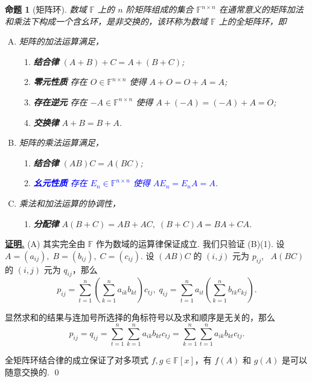 \documentclass[10pt,openany]{article}
\theoremstyle{thmstyle} %
\theoremstyle{defstyle} %
\theoremstyle{prostyle} %
\newtheorem{proposition}[theorem]{命题}
\theoremstyle{exastyle}
\theoremstyle{remstyle}
\renewenvironment{proof}[1][证明]{\par\underline{\textbf{#1.}} \;\fangsong}{\qed\par}
\newcommand{\F}{\mathbb{F}}
\begin{document}
\begin{proposition}[矩阵环]
	数域 \( \F \) 上的 \( n \) 阶矩阵组成的集合 \( \F^{n \times n} \) 在通常意义的矩阵加法和乘法下构成一个含幺环，是非交换的，该环称为数域 \( \F \) 上的全矩阵环，即
	\begin{enumerate}[(A)]
		\item 矩阵的加法运算满足，
		\begin{enumerate}[(1)]
			\item \textbf{结合律} \( (A+B)+C=A+(B+C) \);
			\item \textbf{零元性质} 存在 \( O \in \F^{n \times n} \) 使得 \( A+O=O+A=A \);
			\item \textbf{存在逆元} 存在 \( -A \in \F^{n \times n} \) 使得 \( A+(-A)=(-A)+A=O \);
			\item \textbf{交换律} \( A+B=B+A \).
		\end{enumerate}
		\item 矩阵的乘法运算满足，
		\begin{enumerate}[(1)]
			\item \textbf{结合律} \( (AB)C=A(BC) \);
			\item \textcolor{blue}{\textbf{幺元性质} 存在 \( E_n \in \F^{n \times n} \) 使得 \( AE_n=E_nA=A \)}.
		\end{enumerate}
		\item 乘法和加法运算的协调性，
		\begin{enumerate}[(1)]
			\item \textbf{分配律} \( A(B+C)=AB+AC, \; (B+C)A=BA+CA \).
		\end{enumerate}
	\end{enumerate}
\end{proposition}

\begin{proof}
    (A) 其实完全由 \( \F \) 作为数域的运算律保证成立. 我们只验证 (B)(1). 设 \( A=(a_{ij}), \; B=(b_{ij}), \; C=(c_{ij})\). 设 \( (AB)C \) 的 \( (i,j) \) 元为 \( p_{ij} \), \ \( A(BC) \) 的 \( (i,j) \) 元为 \( q_{ij} \)，那么
    \[ p_{ij}=\sum_{t=1}^{n}\left(\sum_{k=1}^{n}a_{ik}b_{kt} \right) c_{tj}, \; q_{ij}= \sum_{t=1}^{n} a_{it} \left( \sum_{k=1}^{n} b_{tk}c_{kj} \right). \]
    
    显然求和的结果与连加号所选择的角标符号以及求和顺序是无关的，那么
    \[ p_{ij}=q_{ij}=\sum_{t=1}^{n}\sum_{k=1}^{n}a_{ik}b_{kt}c_{tj}=\sum_{k=1}^{n}\sum_{t=1}^{n}a_{ik}b_{kt}c_{tj}. \]
    
    全矩阵环结合律的成立保证了对多项式 \( f,g \in \F[x] \)，有 \( f(A) \) 和 \( g(A) \) 是可以随意交换的.
\end{proof}
\end{document}
